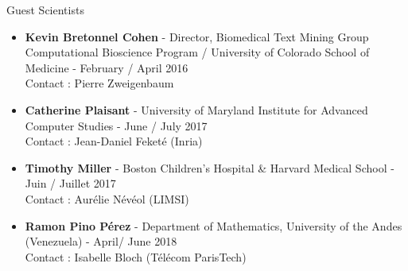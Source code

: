 \begin{frame}{Guest Scientists}

\begin{itemize}
\item 
\textbf{Kevin Bretonnel Cohen} - Director, Biomedical Text Mining Group Computational Bioscience
Program / University of Colorado School of Medicine  - February / April 2016
\\
Contact : Pierre Zweigenbaum
\item 
\textbf{Catherine Plaisant} - University of Maryland Institute for Advanced Computer Studies -
June / July 2017
\\
Contact : Jean-Daniel Feket\'e (Inria)
\item
\textbf{Timothy Miller} - Boston Children's Hospital \& Harvard Medical School - Juin / Juillet 2017
\\
Contact : Aur\'elie N\'ev\'eol (LIMSI)
\item
\textbf{Ramon Pino P\'erez} - Department of Mathematics, University of the Andes (Venezuela) - April/ June 2018
\\
Contact : Isabelle Bloch (T\'el\'ecom ParisTech)
\end{itemize}
\end{frame}

